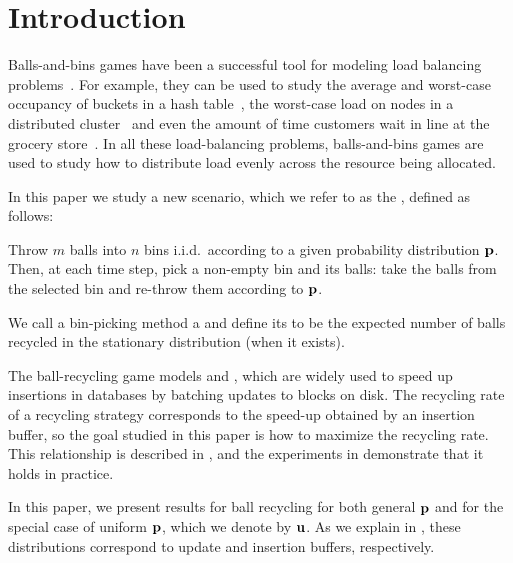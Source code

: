 
\section{Introduction}

Balls-and-bins games have been a successful tool for modeling load balancing
problems~\cite{Mitzenmacher96,AdlerChMi98,AdlerBeSc98,AzarBrKa94,ColeFrMa98,ColeMaMe98,CzumajSt97,Mitzenmacher96a,Mitzenmacher98,MitzenmacherRiSi00,Voecking03,BringmannSaSt16,Park17,WestZaWa16,farach-Colton:2009,conway_et_al:LIPIcs:2018:9043}.
For example, they can be used to study the average and worst-case occupancy of
buckets in a hash table~\cite{BenjaminiMa12}, the worst-case load on nodes in a
distributed cluster~\cite{PetrovaOlMa10,BerenbrinkFrKl16} and even the amount
of time customers wait in line at the grocery store~\cite{Mitzenmacher98}.  In
all these load-balancing problems, balls-and-bins games are used to study how
to distribute load evenly across the resource being allocated.

In this paper we study a new scenario, which we refer to as the
, defined as follows:
\begin{displayquote}
	Throw $m$ balls into $n$ bins i.i.d.\ according to a given probability
	distribution $\mathbf{p}$.  Then, at each time step, pick a non-empty bin and
	 its balls: take the balls from the selected bin and re-throw
	them according to $\mathbf{p}$.
\end{displayquote}
We call a bin-picking method a  and define its
 to be the expected number of balls recycled in the
stationary distribution (when it exists).

The ball-recycling game models  and , which are widely used to speed up insertions in databases by batching
updates to blocks on disk. The recycling rate of a recycling strategy
corresponds to the speed-up obtained by an insertion buffer, so the goal
studied in this paper is how to maximize the recycling rate. This relationship
is described in , and the experiments in
 demonstrate that it holds in practice.

In this paper, we present results for ball recycling for both general $\mathbf{p}$ and
for the special case of uniform $\mathbf{p}$, which we denote by $\mathbf{u}$.  As we explain
in , these distributions correspond to update and
insertion buffers, respectively.

